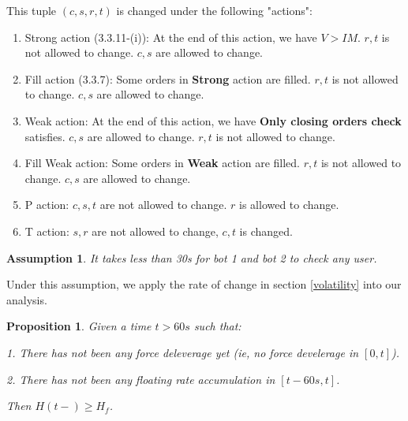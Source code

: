 \documentclass[notitlepage,reqno,11pt]{amsart}
\numberwithin{equation}{section}
\newtheorem{assumption}{Assumption}[section]
\newtheorem{prop}{Proposition}[section]
\begin{document}
This tuple $(c,s,r,t)$ is changed under the following "actions":
\begin{enumerate}
    \item Strong action (3.3.11-(i)): At the end of this action, we have $V > IM$. $r,t$ is not allowed to change. $c,s$ are allowed to change.
    \item Fill action (3.3.7): Some orders in \textbf{Strong} action are filled. $r,t$ is not allowed to change. $c,s$ are allowed to change.
    \item Weak action: At the end of this action, we have \textbf{Only closing orders check} satisfies. $c,s$ are allowed to change. $r,t$ is not allowed to change.
    \item Fill Weak action: Some orders in \textbf{Weak} action are filled. $r,t$ is not allowed to change. $c,s$ are allowed to change.
    \item P action: $c,s,t$ are not allowed to change. $r$ is allowed to change.
    \item T action: $s,r$ are not allowed to change, $c,t$ is changed.
\end{enumerate}

\begin{assumption}\label{fast-bot}
    It takes less than 30s for bot 1 and bot 2 to check any user.
\end{assumption}
Under this assumption, we apply the rate of change in section \ref{volatility} into our analysis.

\begin{prop}\label{safe-core-1}
    Given a time $t>60s$ such that: 

    1. There has not been any force deleverage yet (ie, no force develerage in $[0,t]$).
    
    2. There has not been any floating rate accumulation in $[t-60s, t]$.

Then $H(t-) \geq H_f$.

\end{prop}
\end{document}
